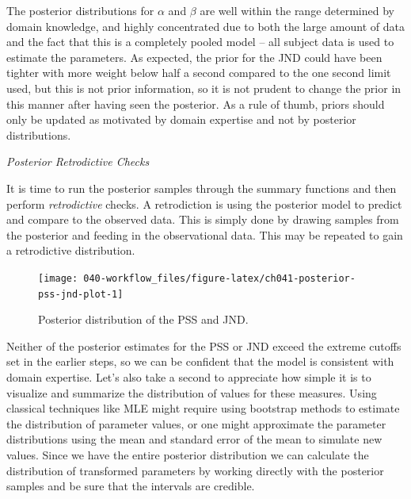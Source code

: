 \documentclass[11pt, oneside, openany]{scrbook}
\newenvironment{Shaded}{\begin{snugshade}}{\end{snugshade}}
\newcommand{\FloatTok}[1]{\textcolor[rgb]{0.00,0.00,0.81}{#1}}
\newcommand{\KeywordTok}[1]{\textcolor[rgb]{0.13,0.29,0.53}{\textbf{#1}}}
\newcommand{\NormalTok}[1]{#1}
\newcommand{\OperatorTok}[1]{\textcolor[rgb]{0.81,0.36,0.00}{\textbf{#1}}}
\newcommand{\StringTok}[1]{\textcolor[rgb]{0.31,0.60,0.02}{#1}}
\begin{document}
The posterior distributions for \(\alpha\) and \(\beta\) are well within the range determined by domain knowledge, and highly concentrated due to both the large amount of data and the fact that this is a completely pooled model -- all subject data is used to estimate the parameters. As expected, the prior for the JND could have been tighter with more weight below half a second compared to the one second limit used, but this is not prior information, so it is not prudent to change the prior in this manner after having seen the posterior. As a rule of thumb, priors should only be updated as motivated by domain expertise and not by posterior distributions.

\emph{Posterior Retrodictive Checks}

It is time to run the posterior samples through the summary functions and then perform \emph{retrodictive} checks. A retrodiction is using the posterior model to predict and compare to the observed data. This is simply done by drawing samples from the posterior and feeding in the observational data. This may be repeated to gain a retrodictive distribution.

\begin{Shaded}
\end{Shaded}

\begin{figure}

{\centering \texttt{[image: 040-workflow\_files/figure-latex/ch041-posterior-pss-jnd-plot-1]} 

}

\caption{Posterior distribution of the PSS and JND.}\label{fig:ch041-posterior-pss-jnd-plot}
\end{figure}

Neither of the posterior estimates for the PSS or JND exceed the extreme cutoffs set in the earlier steps, so we can be confident that the model is consistent with domain expertise. Let's also take a second to appreciate how simple it is to visualize and summarize the distribution of values for these measures. Using classical techniques like MLE might require using bootstrap methods to estimate the distribution of parameter values, or one might approximate the parameter distributions using the mean and standard error of the mean to simulate new values. Since we have the entire posterior distribution we can calculate the distribution of transformed parameters by working directly with the posterior samples and be sure that the intervals are credible.
\end{document}
